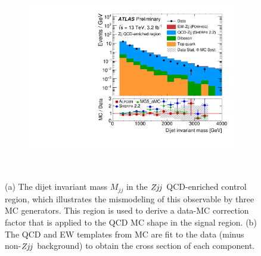 \documentclass{PoS}
\def\zjj{\ensuremath{Z\kern -0.1em j\kern -0.1emj}\xspace}
\def\mjj{\ensuremath{M_{jj}}\xspace}
\begin{document}
\begin{figure}
  \centering
  \begin{subfigure}[t]{0.50\textwidth}
    \includegraphics[width=.99\textwidth]{STDM-2016-09/fig_02b.pdf}\vspace{-6mm}
    \caption{}
  \end{subfigure}%
  ~
  \begin{subfigure}[t]{0.50\textwidth}
    \vspace{-6mm}
  \caption{}
  \end{subfigure}%
  \caption{(a) The dijet invariant mass \mjj in the \zjj QCD-enriched control region, which illustrates
the mismodeling of this observable by three MC generators. This region is used to derive a data-MC
correction factor that is applied to the QCD MC shape in the signal region.
(b) The QCD and EW templates from MC are fit to the data (minus non-\zjj background) to obtain the
cross section of each component.
}
  \label{zjj-dijet-post-fit}
\end{figure}
\end{document}

